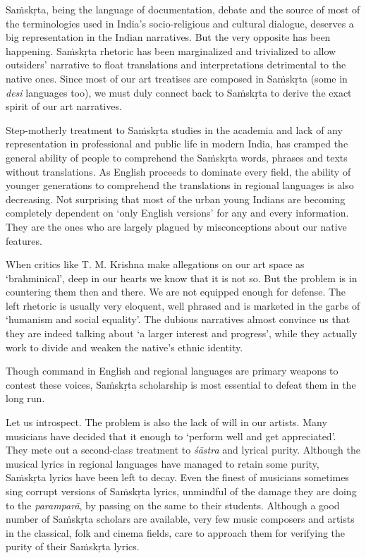 Saṁskṛta, being the language of documentation, debate and the source of most of the terminologies used in India’s socio-religious and cultural dialogue, deserves a big representation in the Indian narratives. But the very opposite has been happening. Saṁskṛta rhetoric has been marginalized and trivialized to allow outsiders’ narrative to float translations and interpretations detrimental to the native ones. Since most of our art treatises are composed in Saṁskṛta (some in \textit{desi} languages too), we must duly connect back to Saṁskṛta to derive the exact spirit of our art narratives.

Step-motherly treatment to Saṁskṛta studies in the academia and lack of any representation in professional and public life in modern India, has cramped the general ability of people to comprehend the Saṁskṛta words, phrases and texts without translations. As English proceeds to dominate every field, the ability of younger generations to comprehend the translations in regional languages is also decreasing. Not surprising that most of the urban young Indians are becoming completely dependent on ‘only English versions’ for any and every information. They are the ones who are largely plagued by misconceptions about our native features.

When critics like T. M. Krishna make allegations on our art space as ‘brahminical’, deep in our hearts we know that it is not so. But the problem is in countering them then and there. We are not equipped enough for defense. The left rhetoric is usually very eloquent, well phrased and is marketed in the garbs of ‘humanism and social equality’. The dubious narratives almost convince us that they are indeed talking about ‘a larger interest and progress’, while they actually work to divide and weaken the native’s ethnic identity.

Though command in English and regional languages are primary weapons to contest these voices, Saṁskṛta scholarship is most essential to defeat them in the long run.

Let us introspect. The problem is also the lack of will in our artists. Many musicians have decided that it enough to ‘perform well and get appreciated’. They mete out a second-class treatment to \textit{śāstra} and lyrical purity. Although the musical lyrics in regional languages have managed to retain some purity, Saṁskṛta lyrics have been left to decay. Even the finest of musicians sometimes sing corrupt versions of Saṁskṛta lyrics, unmindful of the damage they are doing to the \textit{paramparā}, by passing on the same to their students. Although a good number of Saṁskṛta scholars are available, very few music composers and artists in the classical, folk and cinema fields, care to approach them for verifying the purity of their Saṁskṛta lyrics.

